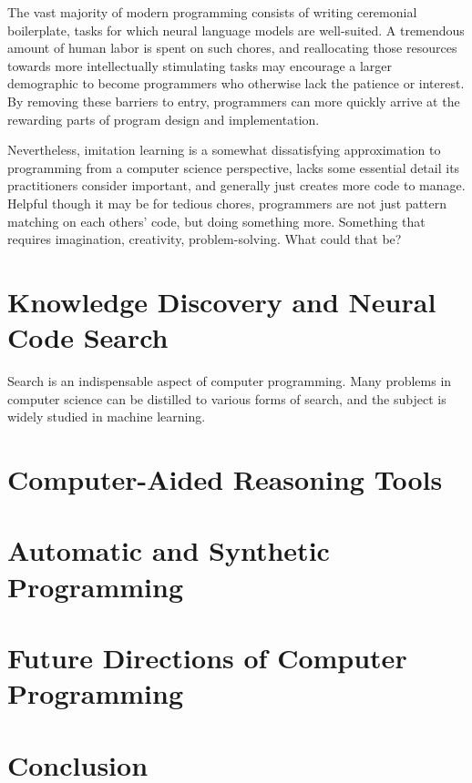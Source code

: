 \documentclass[10pt]{article}
\begin{document}
The vast majority of modern programming consists of writing ceremonial boilerplate, tasks for which neural language models are well-suited. A tremendous amount of human labor is spent on such chores, and reallocating those resources towards more intellectually stimulating tasks may encourage a larger demographic to become programmers who otherwise lack the patience or interest. By removing these barriers to entry, programmers can more quickly arrive at the rewarding parts of program design and implementation.

Nevertheless, imitation learning is a somewhat dissatisfying approximation to programming from a computer science perspective, lacks some essential detail its practitioners consider important, and generally just creates more code to manage. Helpful though it may be for tedious chores, programmers are not just pattern matching on each others' code, but doing something more. Something that requires imagination, creativity, problem-solving. What could that be?

  \section{Knowledge Discovery and Neural Code Search}

  Search is an indispensable aspect of computer programming. Many problems in computer science can be distilled to various forms of search, and the subject is widely studied in machine learning.



  \section{Computer-Aided Reasoning Tools}

  \section{Automatic and Synthetic Programming}

  \section{Future Directions of Computer Programming}

  \section{Conclusion}

  
  
\end{document}
